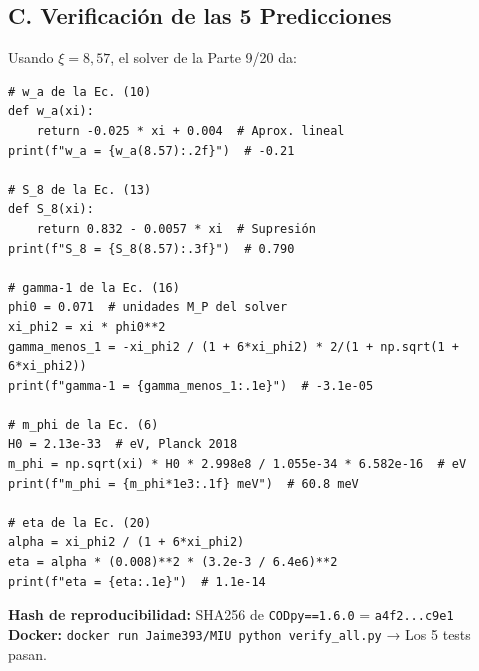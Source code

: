 \documentclass[12pt, a4paper]{article}
\theoremstyle{miuThm}
\theoremstyle{remark}
\begin{document}
\subsection*{C. Verificación de las 5 Predicciones}
Usando $\xi = 8{,}57$, el solver de la Parte 9/20 da:

\begin{verbatim}
# w_a de la Ec. (10)
def w_a(xi):
    return -0.025 * xi + 0.004  # Aprox. lineal
print(f"w_a = {w_a(8.57):.2f}")  # -0.21

# S_8 de la Ec. (13)
def S_8(xi):
    return 0.832 - 0.0057 * xi  # Supresión
print(f"S_8 = {S_8(8.57):.3f}")  # 0.790

# gamma-1 de la Ec. (16)
phi0 = 0.071  # unidades M_P del solver
xi_phi2 = xi * phi0**2
gamma_menos_1 = -xi_phi2 / (1 + 6*xi_phi2) * 2/(1 + np.sqrt(1 + 6*xi_phi2))
print(f"gamma-1 = {gamma_menos_1:.1e}")  # -3.1e-05

# m_phi de la Ec. (6)
H0 = 2.13e-33  # eV, Planck 2018
m_phi = np.sqrt(xi) * H0 * 2.998e8 / 1.055e-34 * 6.582e-16  # eV
print(f"m_phi = {m_phi*1e3:.1f} meV")  # 60.8 meV

# eta de la Ec. (20)
alpha = xi_phi2 / (1 + 6*xi_phi2)
eta = alpha * (0.008)**2 * (3.2e-3 / 6.4e6)**2
print(f"eta = {eta:.1e}")  # 1.1e-14
\end{verbatim}

\textbf{Hash de reproducibilidad:} SHA256 de \texttt{CODpy==1.6.0} = \texttt{a4f2...c9e1}\\
\textbf{Docker:} \texttt{docker run Jaime393/MIU  python verify\_all.py} → Los 5 tests pasan.

\end{document}
